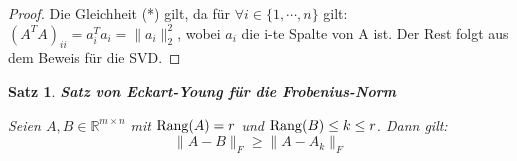 \documentclass{article}
\newcommand{\R}[0]{\mathbb{R}}
\newtheorem{thm}{Satz}
\begin{document}
\begin{proof} \cite[S. 73]{strang2019linear}
    Die Gleichheit (*) gilt, da für $\forall i\in \{1, \cdots, n\}$ gilt: $(A^TA)_{ii} = a_i^Ta_i = \lVert a_i \rVert^2_2$, wobei $a_i$ die i-te Spalte von A ist.
    Der Rest folgt aus dem Beweis für die SVD.
\end{proof}

\begin{thm} \textbf{Satz von Eckart-Young für die Frobenius-Norm}

    Seien $A, B \in \R^{m \times n}$ mit ${\rm Rang}(A) = r$ und ${\rm Rang}(B) \leq k \leq r$. Dann gilt:
    \begin{equation}
        \lVert A - B \rVert_F \geq \lVert A - A_k \rVert_F
    \end{equation}
\end{thm}
\end{document}

